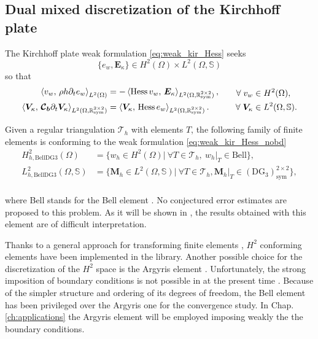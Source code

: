 \subsection{Dual mixed discretization of the Kirchhoff plate}
The Kirchhoff plate weak formulation \eqref{eq:weak_kir_Hess}  seeks
$$\{e_w,\bm{E}_{\kappa}\} \in H^{2}(\Omega) \times L^2(\Omega, \mathbb{S}) $$
so that 
\begin{equation}\label{eq:weak_kir_Hess_nobd}
\begin{aligned}
\inner[L^2(\Omega)]{v_w}{\rho h \partial_t e_w} &= -\inner[L^2(\Omega, \mathbb{R}^{2\times 2}_{\text{sym}})]{\Hess v_w}{\bm{E}_\kappa}, \\
\inner[L^2(\Omega, \mathbb{R}^{2\times 2}_{\text{sym}})]{\bm{V}_\kappa}{\bm{\mathcal{C}_b} \partial_t \bm{V}_\kappa} &= \inner[L^2(\Omega, \mathbb{R}^{2\times 2}_{\text{sym}})]{\bm{V}_\kappa}{\Hess e_w}. \\
\end{aligned} \qquad
\begin{aligned}
\forall \; v_w &\in H^2(\Omega), \\
\forall \; \bm{V}_\kappa &\in L^2(\Omega, \mathbb{S}).
\end{aligned}
\end{equation}


Given a regular triangulation $\mathcal{T}_h$ with elements $T$, the following family of finite elements is conforming to the weak formulation \eqref{eq:weak_kir_Hess_nobd}
\begin{equation}\label{eq:BellDG3}
\begin{aligned}
H_{h, \mathrm{BellDG3}}^{2}(\Omega) &= \{w_h \in H^2(\Omega) \vert \ \forall T \in \mathcal{T}_h, \ w_h|_{T} \in \mathrm{Bell} \}, \\
L_{h, \mathrm{BellDG3}}^2(\Omega, \mathbb{S}) &= \{ \bm{M}_h \in L^2(\Omega, \mathbb{S}) \vert \ \forall T \in \mathcal{T}_h, \bm{M}_h|_{T} \in (\mathrm{DG}_{3})^{2 \times 2}_{\text{sym}} \}, \\
\end{aligned}
\end{equation}

where Bell stands for the Bell element \cite{bell1969}. No conjectured error estimates are proposed to this problem. As it will be shown in , the results obtained with this element are of difficult interpretation.

\begin{remark}\label{rmk:BellArg}
	Thanks to a general approach for transforming finite elements \cite{kirby2018general}, $H^2$ conforming elements have been implemented in the {} library. 	Another possible choice for the discretization of the $H^2$ space is the Argyris element \cite{argyris1968}.  Unfortunately, the strong imposition of boundary conditions is not possible in {} at the present time \cite[Sec. 3.2]{kirby2019}. Because of the simpler structure and ordering of its degrees of freedom, the Bell element has been privileged over the Argyris one for the convergence study. In Chap. \ref{ch:applications} the Argyris element will be employed imposing weakly the the boundary conditions.
\end{remark}

